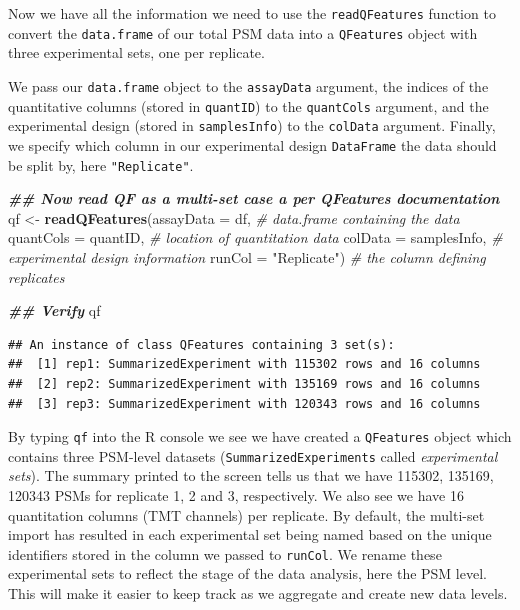 \documentclass[9pt,a4paper,]{extarticle}
\newenvironment{Shaded}{\begin{snugshade}}{\end{snugshade}}
\newcommand{\AttributeTok}[1]{\textcolor[rgb]{0.13,0.29,0.53}{#1}}
\newcommand{\CommentTok}[1]{\textcolor[rgb]{0.56,0.35,0.01}{\textit{#1}}}
\newcommand{\DocumentationTok}[1]{\textcolor[rgb]{0.56,0.35,0.01}{\textbf{\textit{#1}}}}
\newcommand{\FunctionTok}[1]{\textcolor[rgb]{0.13,0.29,0.53}{\textbf{#1}}}
\newcommand{\NormalTok}[1]{#1}
\newcommand{\OtherTok}[1]{\textcolor[rgb]{0.56,0.35,0.01}{#1}}
\newcommand{\StringTok}[1]{\textcolor[rgb]{0.31,0.60,0.02}{#1}}
\begin{document}
Now we have all the information we need to use the \texttt{readQFeatures} function
to convert the \texttt{data.frame} of our total PSM data into a \texttt{QFeatures} object
with three experimental sets, one per replicate.

We pass our \texttt{data.frame} object to the \texttt{assayData} argument, the indices of the
quantitative columns (stored in \texttt{quantID}) to the \texttt{quantCols} argument,
and the experimental design (stored in \texttt{samplesInfo}) to the \texttt{colData} argument.
Finally, we specify which column in our experimental design \texttt{DataFrame} the data
should be split by, here \texttt{"Replicate"}.

\begin{Shaded}
\begin{Highlighting}[]
\DocumentationTok{\#\# Now read QF as a multi{-}set case a per QFeatures documentation}
\NormalTok{qf }\OtherTok{\textless{}{-}} \FunctionTok{readQFeatures}\NormalTok{(}\AttributeTok{assayData =}\NormalTok{ df,          }\CommentTok{\# data.frame containing the data }
                    \AttributeTok{quantCols =}\NormalTok{ quantID,     }\CommentTok{\# location of quantitation data}
                    \AttributeTok{colData =}\NormalTok{ samplesInfo,   }\CommentTok{\# experimental design information }
                    \AttributeTok{runCol =} \StringTok{"Replicate"}\NormalTok{)    }\CommentTok{\# the column defining replicates}


\DocumentationTok{\#\# Verify }
\NormalTok{qf}
\end{Highlighting}
\end{Shaded}

\begin{verbatim}
## An instance of class QFeatures containing 3 set(s):
##  [1] rep1: SummarizedExperiment with 115302 rows and 16 columns 
##  [2] rep2: SummarizedExperiment with 135169 rows and 16 columns 
##  [3] rep3: SummarizedExperiment with 120343 rows and 16 columns
\end{verbatim}

By typing \texttt{qf} into the R console we see we have created a \texttt{QFeatures} object
which contains three PSM-level datasets (\texttt{SummarizedExperiments} called
\emph{experimental sets}). The summary printed to the screen tells us that we have
115302, 135169, 120343 PSMs for replicate
1, 2 and 3, respectively. We also see we have 16 quantitation
columns (TMT channels) per replicate. By default, the multi-set import has resulted
in each experimental set being named based on the unique identifiers stored
in the column we passed to \texttt{runCol}. We rename these experimental sets to
reflect the stage of the data analysis, here the PSM level. This will make it
easier to keep track as we aggregate and create new data levels.
\end{document}

